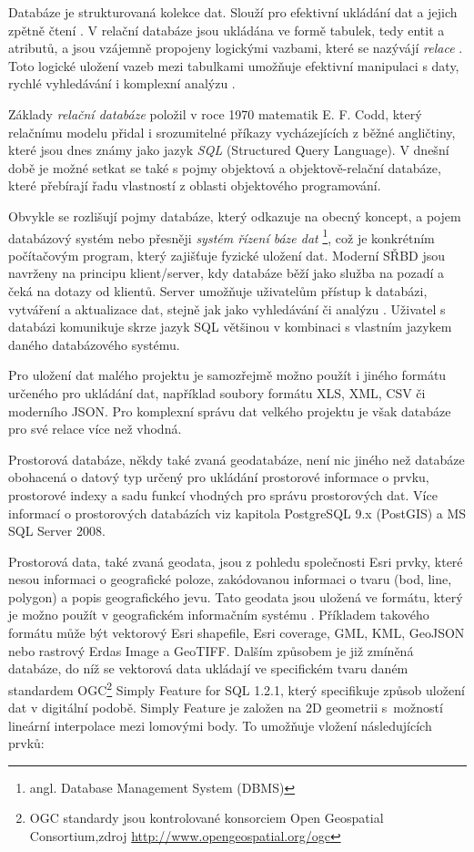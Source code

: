 Databáze je strukturovaná kolekce dat. Slouží pro efektivní ukládání dat a jejich zpětně čtení \citep{Oppel2009}. V relační databáze jsou ukládána ve formě tabulek, tedy entit a atributů, a jsou vzájemně propojeny logickými vazbami, které se nazývájí {\it relace} \citep{Connolly2005}. Toto logické uložení vazeb mezi tabulkami umožňuje efektivní manipulaci s daty, rychlé vyhledávání i komplexní analýzu \citep{Momjian2001}. 

Základy {\it relační databáze} položil v roce 1970 matematik E. F. Codd, který relačnímu modelu přidal i srozumitelné příkazy vycházejících z běžné angličtiny, které jsou dnes známy jako jazyk {\it SQL} (Structured Query Language)\citep{Zak2001}. V dnešní době je možné setkat se také s pojmy objektová a objektově-relační databáze, které přebírají řadu vlastností z oblasti objektového programování.

Obvykle se rozlišují pojmy databáze, který odkazuje na obecný koncept, a pojem databázový systém nebo přesněji {\it systém řízení báze dat} \footnote{angl. Database Management System (DBMS)}, což je konkrétním počítačovým program, který zajišťuje fyzické uložení dat. Moderní SŘBD jsou navrženy na principu klient/server, kdy databáze běží jako služba na pozadí a čeká na dotazy od klientů. Server umožňuje uživatelům přístup k databázi, vytváření a aktualizace dat, stejně jak jako vyhledávání či analýzu \citep{Connolly2005}. Uživatel s databázi komunikuje skrze jazyk SQL většinou v kombinaci s vlastním jazykem daného databázového systému.

Pro uložení dat malého projektu je samozřejmě možno použít i jiného formátu určeného pro ukládání dat, například soubory formátu XLS, XML, CSV či moderního JSON. Pro komplexní správu dat velkého projektu je však databáze pro své relace více než vhodná. 

Prostorová databáze, někdy také zvaná geodatabáze, není nic jiného než databáze obohacená o datový typ určený pro ukládání prostorové informace o prvku, prostorové indexy a sadu funkcí vhodných pro správu prostorových dat. Více informací o prostorových databázích viz kapitola  PostgreSQL 9.x (PostGIS) a  MS SQL Server 2008. 

Prostorová data, také zvaná geodata, jsou z pohledu společnosti Esri prvky, které nesou informaci o geografické poloze, zakódovanou informaci o tvaru (bod, line, polygon) a popis geografického jevu. Tato geodata jsou uložená ve formátu, který je možno použít v geografickém informačním systému \citep{Esri2006}. Příkladem takového formátu může být vektorový Esri shapefile, Esri coverage, GML, KML, GeoJSON nebo rastrový Erdas Image a GeoTIFF. Dalším způsobem je již zmíněná databáze, do níž se vektorová data ukládají ve specifickém tvaru daném standardem OGC\footnote{OGC standardy jsou kontrolované konsorciem Open Geospatial Consortium,\newline zdroj \url{http://www.opengeospatial.org/ogc}} Simply Feature for SQL 1.2.1, který specifikuje způsob uložení dat v digitální podobě. Simply Feature je založen na 2D geometrii s~možností lineární interpolace mezi lomovými body. To umožňuje vložení následujících prvků:

